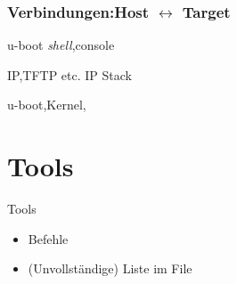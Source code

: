 \begin{frame}
 \frametitle{Verbindungen:Host $\leftrightarrow$ Target}
 \begin{description}[MemoryCard]
  \item[RS232] u-boot {\em shell},\linux console
  \item[Ethernet] IP,TFTP etc. IP Stack
  \item[MemoryCard] u-boot,Kernel,\unix
 \end{description}
\end{frame}

\section{Tools}
\begin{frame}{Tools}
 \begin{itemize}
  \item \unix Befehle
  \item (Unvollständige) Liste im File 
 \end{itemize}
\end{frame}

